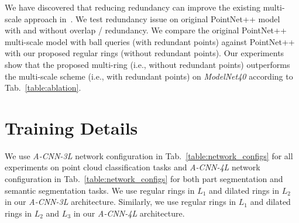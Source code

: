 \documentclass[10pt,twocolumn,letterpaper]{article}
\begin{document}
\begin{table}[h]
\centering
\caption{Experiments on redundancy on \emph{ModelNet40} dataset. AAC is accuracy average class, OA is overall accuracy.}\vspace{-2mm}
\vspace{-2mm}
\label{table:ablation}
\end{table}


We have discovered that reducing redundancy can improve the existing multi-scale approach in~\cite{qi2017pointnet++}. We test redundancy issue on original PointNet++ model~\cite{qi2017pointnet++} with and without overlap / redundancy. We compare the original PointNet++ multi-scale model with ball queries (with redundant points) against PointNet++ with our proposed regular rings (without redundant points). Our experiments show that the proposed multi-ring (i.e., without redundant points) outperforms the multi-scale scheme (i.e., with redundant points) on \emph{ModelNet40} according to Tab.~\ref{table:ablation}.

\vspace{-1mm}
\section{Training Details}
\label{sec:suppl_training_details} 
\vspace{-1.5mm}
We use \textit{A-CNN-3L} network configuration in Tab.~\ref{table:network_configs} for all experiments on point cloud classification tasks and \textit{A-CNN-4L} network configuration in Tab.~\ref{table:network_configs} for both part segmentation and semantic segmentation tasks. We use regular rings in $L_1$ and dilated rings in $L_2$ in our \textit{A-CNN-3L} architecture. Similarly, we use regular rings in $L_1$ and dilated rings in $L_2$ and $L_3$ in our \textit{A-CNN-4L} architecture.
\end{document}
